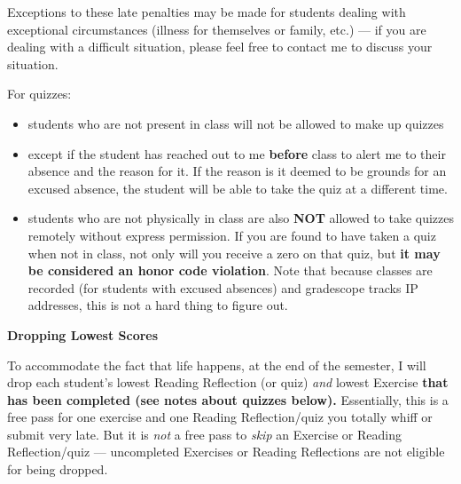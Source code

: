 \documentclass[12pt]{article}
\begin{document}
Exceptions to these late penalties may be made for students dealing with exceptional circumstances (illness for themselves or family, etc.) — if you are dealing with a difficult situation, please feel free to contact me to discuss your situation.

For quizzes: 

\begin{itemize}
	\item students who are not present in class will not be allowed to make up quizzes
	\item except if the student has reached out to me \textbf{before} class to alert me to their absence and the reason for it. If the reason is it deemed to be grounds for an excused absence, the student will be able to take the quiz at a different time.
	\item students who are not physically in class are also \textbf{NOT} allowed to take quizzes remotely without express permission. If you are found to have taken a quiz when not in class, not only will you receive a zero on that quiz, but \textbf{it may be considered an honor code violation}. Note that because classes are recorded (for students with excused absences) and gradescope tracks IP addresses, this is not a hard thing to figure out.
\end{itemize}

\textbf{Dropping Lowest Scores}

To accommodate the fact that life happens, at the end of the semester, I will drop each student's lowest Reading Reflection (or quiz) \emph{and} lowest Exercise \textbf{that has been completed (see notes about quizzes below).} Essentially, this is a free pass for one exercise and one Reading Reflection/quiz you totally whiff or submit very late. But it is \emph{not} a free pass to \emph{skip} an Exercise or Reading Reflection/quiz — uncompleted Exercises or Reading Reflections are not eligible for being dropped.
\end{document}
